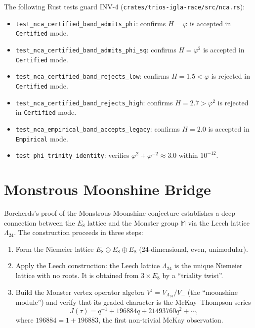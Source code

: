 The following Rust tests guard INV-4 (\texttt{crates/trios-igla-race/src/nca.rs}):

\begin{itemize}
  \item \texttt{test\_nca\_certified\_band\_admits\_phi}: confirms
    \(H = \varphi\) is accepted in \texttt{Certified} mode.
  \item \texttt{test\_nca\_certified\_band\_admits\_phi\_sq}: confirms
    \(H = \varphi^2\) is accepted in \texttt{Certified} mode.
  \item \texttt{test\_nca\_certified\_band\_rejects\_low}: confirms
    \(H = 1.5 < \varphi\) is rejected in \texttt{Certified} mode.
  \item \texttt{test\_nca\_certified\_band\_rejects\_high}: confirms
    \(H = 2.7 > \varphi^2\) is rejected in \texttt{Certified} mode.
  \item \texttt{test\_nca\_empirical\_band\_accepts\_legacy}: confirms
    \(H = 2.0\) is accepted in \texttt{Empirical} mode.
  \item \texttt{test\_phi\_trinity\_identity}: verifies
    \(\varphi^2 + \varphi^{-2} \approx 3.0\) within \(10^{-12}\).
\end{itemize}

\section{Monstrous Moonshine Bridge}
\label{sec:e8-moonshine}

Borcherds's proof of the Monstrous Moonshine conjecture
\cite{borcherds1992monstrous_moonshine} establishes a deep connection
between the \(E_8\) lattice and the Monster group \(\mathbb{M}\) via
the Leech lattice \(\Lambda_{24}\).  The construction proceeds in
three steps:

\begin{enumerate}
  \item Form the Niemeier lattice \(E_8 \oplus E_8 \oplus E_8\)
    (24-dimensional, even, unimodular).
  \item Apply the Leech construction: the Leech lattice
    \(\Lambda_{24}\) is the unique Niemeier lattice with no roots.
    It is obtained from \(3 \times E_8\) by a ``triality twist''.
  \item Build the Monster vertex operator algebra
    \(V^\natural = V_{\Lambda_{24}} / V_-\) (the ``moonshine module'')
    and verify that its graded character is the McKay–Thompson series
    \[
      J(\tau) = q^{-1} + 196884q + 21493760q^2 + \cdots,
    \]
    where \(196884 = 1 + 196883\), the first non-trivial McKay
    observation.
\end{enumerate}

